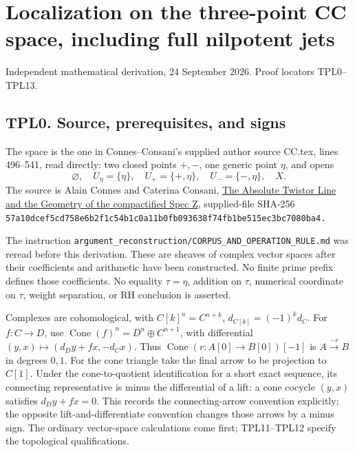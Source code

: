 \section{Localization on the three-point CC space, including full
nilpotent
jets}\label{localization-on-the-three-point-cc-space-including-full-nilpotent-jets}

Independent mathematical derivation, 24 September 2026. Proof locators
TPL0--TPL13.

\subsection{TPL0. Source, prerequisites, and
signs}\label{tpl0.-source-prerequisites-and-signs}

The space is the one in Connes--Consani's supplied author source CC.tex,
lines 496--541, read directly: two closed points \(+,-\), one generic
point \(\eta\), and opens \[
\varnothing,\quad U_\eta=\{\eta\},\quad U_+=\{+,\eta\},
\quad U_-=\{-,\eta\},\quad X.
\tag{TPL0.1}
\] The source is Alain Connes and Caterina Consani,
\href{https://arxiv.org/html/2609.00299v1}{The Absolute Twistor Line and
the Geometry of the compactified Spec Z}, supplied-file SHA-256
\nolinkurl{57a10dcef5cd758e6b2f1c54b1c0a11b0fb093638f74fb1be515ec3bc7080ba4.}

The instruction
\nolinkurl{argument_reconstruction/CORPUS_AND_OPERATION_RULE.md} was
reread before this derivation. These are sheaves of complex vector
spaces after their coefficients and arithmetic have been constructed. No
finite prime prefix defines those coefficients. No equality
\(\tau=\eta\), addition on \(\tau\), numerical coordinate on \(\tau\),
weight separation, or RH conclusion is asserted.

Complexes are cohomological, with \(C[k]^n=C^{n+k}\),
\(d_{C[k]}=(-1)^k d_C\). For \(f:C\to D\), use
\(\operatorname{Cone}(f)^n=D^n\oplus C^{n+1}\), with differential
\((y,x)\mapsto(d_Dy+fx,-d_Cx)\). Thus
\(\operatorname{Cone}(r:A[0]\to B[0])[-1]\) is \(A\xrightarrow{-r}B\) in
degrees \(0,1\). For the cone triangle take the final arrow to be
projection to \(C[1]\). Under the cone-to-quotient identification for a
short exact sequence, its connecting representative is minus the
differential of a lift: a cone cocycle \((y,x)\) satisfies
\(d_Dy+fx=0\). This records the connecting-arrow convention explicitly;
the opposite lift-and-differentiate convention changes those arrows by a
minus sign. The ordinary vector-space calculations come first;
TPL11--TPL12 specify the topological qualifications.

